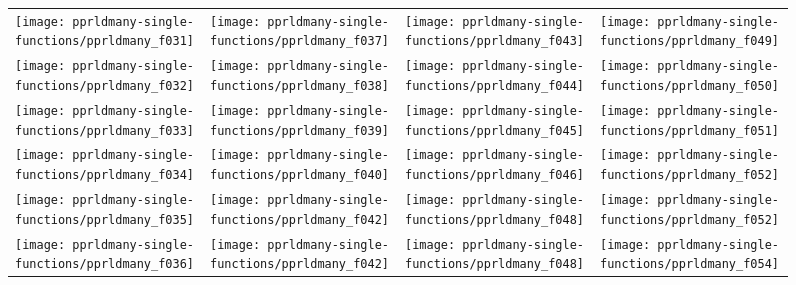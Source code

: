 \documentclass[sigconf]{acmart}
\begin{document}
{%
\begin{figure*}
\centering
\begin{tabular}{l@{\hspace*{-0.00\textwidth}}l@{\hspace*{0.01\textwidth}}l@{\hspace*{-0.00\textwidth}}l}
\texttt{[image: pprldmany-single-functions/pprldmany\_f031]}&
\texttt{[image: pprldmany-single-functions/pprldmany\_f037]}&
\texttt{[image: pprldmany-single-functions/pprldmany\_f043]}&
\texttt{[image: pprldmany-single-functions/pprldmany\_f049]}\\[-0.2em]
\texttt{[image: pprldmany-single-functions/pprldmany\_f032]}&
\texttt{[image: pprldmany-single-functions/pprldmany\_f038]}&
\texttt{[image: pprldmany-single-functions/pprldmany\_f044]}&
\texttt{[image: pprldmany-single-functions/pprldmany\_f050]}\\[-0.2em]
\texttt{[image: pprldmany-single-functions/pprldmany\_f033]}&
\texttt{[image: pprldmany-single-functions/pprldmany\_f039]}&
\texttt{[image: pprldmany-single-functions/pprldmany\_f045]}&
\texttt{[image: pprldmany-single-functions/pprldmany\_f051]}\\[-0.2em]
\texttt{[image: pprldmany-single-functions/pprldmany\_f034]}&
\texttt{[image: pprldmany-single-functions/pprldmany\_f040]}&
\texttt{[image: pprldmany-single-functions/pprldmany\_f046]}&
\texttt{[image: pprldmany-single-functions/pprldmany\_f052]}\\[-0.2em]
\texttt{[image: pprldmany-single-functions/pprldmany\_f035]}&
\texttt{[image: pprldmany-single-functions/pprldmany\_f042]}&
\texttt{[image: pprldmany-single-functions/pprldmany\_f048]}&
\texttt{[image: pprldmany-single-functions/pprldmany\_f052]}\\[-0.2em]
\texttt{[image: pprldmany-single-functions/pprldmany\_f036]}&
\texttt{[image: pprldmany-single-functions/pprldmany\_f042]}&
\texttt{[image: pprldmany-single-functions/pprldmany\_f048]}&
\texttt{[image: pprldmany-single-functions/pprldmany\_f054]}
\vspace*{-1ex}
\end{tabular}
 \caption{\label{fig:ECDFsingleTwo}
}
\end{figure*}
}{} %
\end{document}
